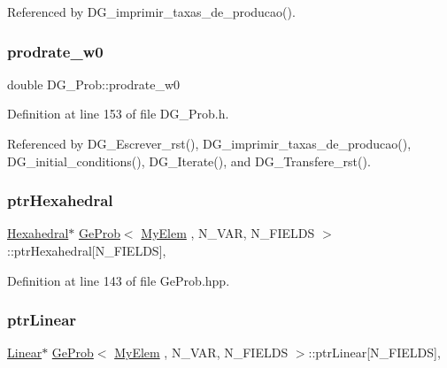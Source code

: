 Referenced by D\+G\+\_\+imprimir\+\_\+taxas\+\_\+de\+\_\+producao().

\mbox{\label{classDG__Prob_acc3fd060620ad62da677c0b88a777235}} 
\subsubsection{\texorpdfstring{prodrate\+\_\+w0}{prodrate\_w0}}
{\footnotesize\ttfamily double D\+G\+\_\+\+Prob\+::prodrate\+\_\+w0\hspace{0.3cm}{\ttfamily [private]}}



Definition at line 153 of file D\+G\+\_\+\+Prob.\+h.



Referenced by D\+G\+\_\+\+Escrever\+\_\+rst(), D\+G\+\_\+imprimir\+\_\+taxas\+\_\+de\+\_\+producao(), D\+G\+\_\+initial\+\_\+conditions(), D\+G\+\_\+\+Iterate(), and D\+G\+\_\+\+Transfere\+\_\+rst().

\mbox{\label{classGeProb_aecb008dc7914d62933407aecbcbbae0a}} 
\subsubsection{\texorpdfstring{ptr\+Hexahedral}{ptrHexahedral}}
{\footnotesize\ttfamily \hyperlink{classHexahedral}{Hexahedral}$\ast$ \hyperlink{classGeProb}{Ge\+Prob}$<$ \hyperlink{DG__Prob_8h_a83cd887ced9a6587428f267e50cd4787}{My\+Elem} , N\+\_\+\+V\+AR, N\+\_\+\+F\+I\+E\+L\+DS $>$\+::ptr\+Hexahedral\mbox{[}N\+\_\+\+F\+I\+E\+L\+DS\mbox{]}\hspace{0.3cm}{\ttfamily [protected]}, {\ttfamily [inherited]}}



Definition at line 143 of file Ge\+Prob.\+hpp.

\mbox{\label{classGeProb_af9350545b7ee2ebe6488a50dd1f38c8c}} 
\subsubsection{\texorpdfstring{ptr\+Linear}{ptrLinear}}
{\footnotesize\ttfamily \hyperlink{classLinear}{Linear}$\ast$ \hyperlink{classGeProb}{Ge\+Prob}$<$ \hyperlink{DG__Prob_8h_a83cd887ced9a6587428f267e50cd4787}{My\+Elem} , N\+\_\+\+V\+AR, N\+\_\+\+F\+I\+E\+L\+DS $>$\+::ptr\+Linear\mbox{[}N\+\_\+\+F\+I\+E\+L\+DS\mbox{]}\hspace{0.3cm}{\ttfamily [protected]}, {\ttfamily [inherited]}}




